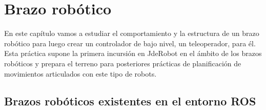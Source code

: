 \chapter{Brazo robótico}
\label{ch:BrazoRobotico}

En este capítulo vamos a estudiar el comportamiento y la estructura de un brazo robótico para luego crear un controlador de bajo nivel, un teleoperador, para él. Esta práctica supone la primera incursión en JdeRobot en el ámbito de los brazos robóticos y prepara el terreno para posteriores prácticas de planificación de movimientos articulados con este tipo de robots.

\section{Brazos robóticos existentes en el entorno ROS}
\label{sec:br_brazosexistentes}

